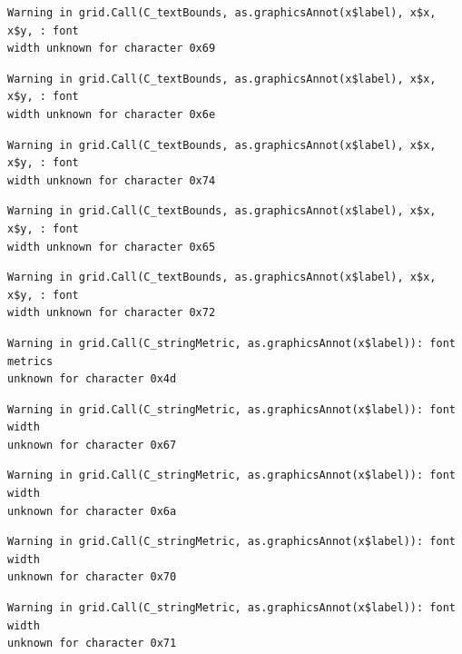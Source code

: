 \documentclass[
  letterpaper,
  DIV=11,
  numbers=noendperiod]{scrreprt}
\begin{document}
\begin{verbatim}
Warning in grid.Call(C_textBounds, as.graphicsAnnot(x$label), x$x, x$y, : font
width unknown for character 0x69
\end{verbatim}

\begin{verbatim}
Warning in grid.Call(C_textBounds, as.graphicsAnnot(x$label), x$x, x$y, : font
width unknown for character 0x6e
\end{verbatim}

\begin{verbatim}
Warning in grid.Call(C_textBounds, as.graphicsAnnot(x$label), x$x, x$y, : font
width unknown for character 0x74
\end{verbatim}

\begin{verbatim}
Warning in grid.Call(C_textBounds, as.graphicsAnnot(x$label), x$x, x$y, : font
width unknown for character 0x65
\end{verbatim}

\begin{verbatim}
Warning in grid.Call(C_textBounds, as.graphicsAnnot(x$label), x$x, x$y, : font
width unknown for character 0x72
\end{verbatim}

\begin{verbatim}
Warning in grid.Call(C_stringMetric, as.graphicsAnnot(x$label)): font metrics
unknown for character 0x4d
\end{verbatim}

\begin{verbatim}
Warning in grid.Call(C_stringMetric, as.graphicsAnnot(x$label)): font width
unknown for character 0x67
\end{verbatim}

\begin{verbatim}
Warning in grid.Call(C_stringMetric, as.graphicsAnnot(x$label)): font width
unknown for character 0x6a
\end{verbatim}

\begin{verbatim}
Warning in grid.Call(C_stringMetric, as.graphicsAnnot(x$label)): font width
unknown for character 0x70
\end{verbatim}

\begin{verbatim}
Warning in grid.Call(C_stringMetric, as.graphicsAnnot(x$label)): font width
unknown for character 0x71
\end{verbatim}
\end{document}

